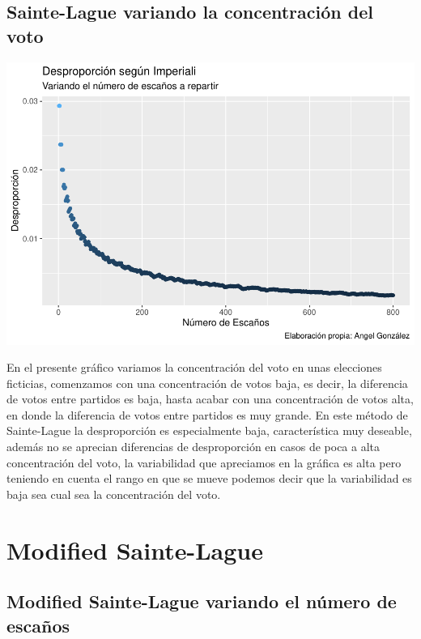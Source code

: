 \documentclass[12pt,a4paper,]{book}
\numberwithin{dummy}{section}
\theoremstyle{ocrenumbox}
\theoremstyle{blacknumex}
\theoremstyle{blacknumbox}
\theoremstyle{ocrenum}
\theoremstyle{ocrenum}
\begin{document}
\hypertarget{sainte-lague-variando-la-concentraciuxf3n-del-voto}{%
\subsection{Sainte-Lague variando la concentración del
voto}\label{sainte-lague-variando-la-concentraciuxf3n-del-voto}}

\begin{center}\includegraphics[width=0.95\linewidth]{figurasR/unnamed-chunk-20-1} \end{center}

En el presente gráfico variamos la concentración del voto en unas
elecciones ficticias, comenzamos con una concentración de votos baja, es
decir, la diferencia de votos entre partidos es baja, hasta acabar con
una concentración de votos alta, en donde la diferencia de votos entre
partidos es muy grande. En este método de Sainte-Lague la desproporción
es especialmente baja, característica muy deseable, además no se
aprecian diferencias de desproporción en casos de poca a alta
concentración del voto, la variabilidad que apreciamos en la gráfica es
alta pero teniendo en cuenta el rango en que se mueve podemos decir que
la variabilidad es baja sea cual sea la concentración del voto.

\hypertarget{modified-sainte-lague}{%
\section{Modified Sainte-Lague}\label{modified-sainte-lague}}

\hypertarget{modified-sainte-lague-variando-el-nuxfamero-de-escauxf1os}{%
\subsection{Modified Sainte-Lague variando el número de
escaños}\label{modified-sainte-lague-variando-el-nuxfamero-de-escauxf1os}}
\end{document}
